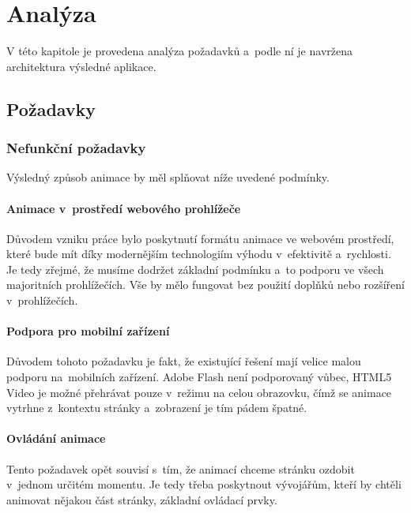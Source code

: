 \chapter{Analýza}


V této kapitole je provedena analýza požadavků a~podle ní je navržena architektura výsledné aplikace. 


\section{Požadavky}

\subsection{Nefunkční požadavky}

Výsledný způsob animace by měl splňovat níže uvedené podmínky.

\subsubsection*{Animace v~prostředí webového prohlížeče}

Důvodem vzniku práce bylo poskytnutí formátu animace ve webovém prostředí, které bude mít díky modernějším technologiím výhodu v~efektivitě a~rychlosti. Je tedy zřejmé, že musíme dodržet základní podmínku a~to podporu ve všech majoritních prohlížečích. Vše by mělo fungovat bez použití doplňků nebo rozšíření v~prohlížečích.

\subsubsection*{Podpora pro mobilní zařízení}

Důvodem tohoto požadavku je fakt, že existující řešení mají velice malou podporu na~mobilních zařízení. Adobe Flash\cite{flash} není podporovaný vůbec, HTML5 Video\cite{html5video} je možné přehrávat pouze v~režimu na celou obrazovku, čímž se animace vytrhne z~kontextu stránky a~zobrazení je tím pádem špatné.

\subsubsection*{Ovládání animace}

Tento požadavek opět souvisí s~tím, že animací chceme stránku ozdobit v~jednom určitém momentu. Je tedy třeba poskytnout vývojářům, kteří by chtěli animovat nějakou část stránky, základní ovládací prvky.



